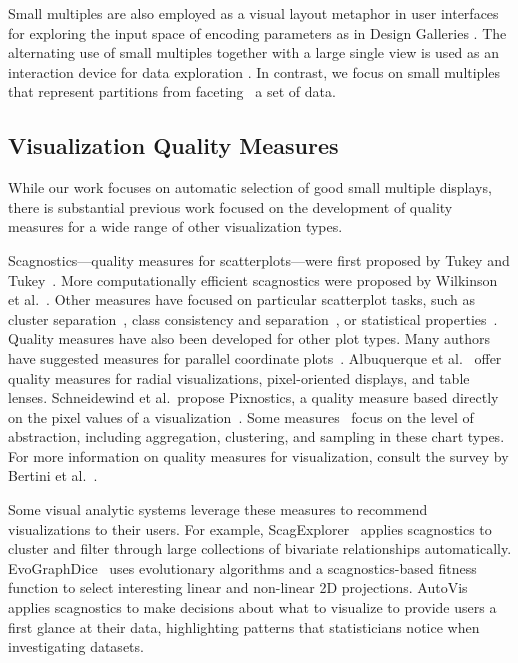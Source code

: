 
Small multiples are also employed as a visual layout metaphor in user interfaces for exploring the input space of encoding parameters as in Design Galleries \cite{marks1997}. The alternating use of small multiples together with a large single view is used as an interaction device for data exploration \cite{van2013}. In contrast, we focus on small multiples that represent partitions from faceting~\cite{Wilkinson2005GG} a set of data.

\subsection{Visualization Quality Measures}
While our work focuses on automatic selection of good small multiple displays, there is substantial previous work focused on the development of quality measures for a wide range of other visualization types. 

Scagnostics---quality measures for scatterplots---were first proposed by Tukey and Tukey~\cite{Tukey1982, Tukey1985}. More computationally efficient scagnostics were proposed by Wilkinson et al.~\cite{Wilkinson2005, Wilkinson2008}. Other measures have focused on particular scatterplot tasks, such as cluster separation~\cite{Sedlmair2012, Tatu2009}, class consistency and separation~\cite{Sips2009, Schafer2013}, or statistical properties~\cite{Kandel2012, Seo2005, Piringer2008}.
Quality measures have also been developed for other plot types. Many authors have suggested measures for parallel coordinate plots~\cite{Ankerst1998, Dasgupta2010, Johansson2009, Yang2003}. Albuquerque et al.~\cite{Albuquerque2010} offer quality measures for radial visualizations, pixel-oriented displays, and table lenses. Schneidewind et al.\ propose Pixnostics, a quality measure based directly on the pixel values of a visualization~\cite{Schneidewind2006}. Some measures~\cite{Bertini2006, Cui2006, Yang2003} focus on the level of abstraction, including aggregation, clustering, and sampling in these chart types. For more information on quality measures for visualization, consult the survey by Bertini et al.~\cite{Bertini2011}. 

Some visual analytic systems leverage these measures to recommend visualizations to their users. For example, ScagExplorer~\cite{Dang2014} applies scagnostics to cluster and filter through large collections of bivariate relationships automatically.
EvoGraphDice~\cite{Boukhelifa2013} uses evolutionary algorithms and a scagnostics-based fitness function to select interesting linear and non-linear 2D projections.
AutoVis~\cite{Wills2010} applies scagnostics to make decisions about what to visualize to provide users a first glance at their data, highlighting patterns that statisticians notice when investigating datasets.

